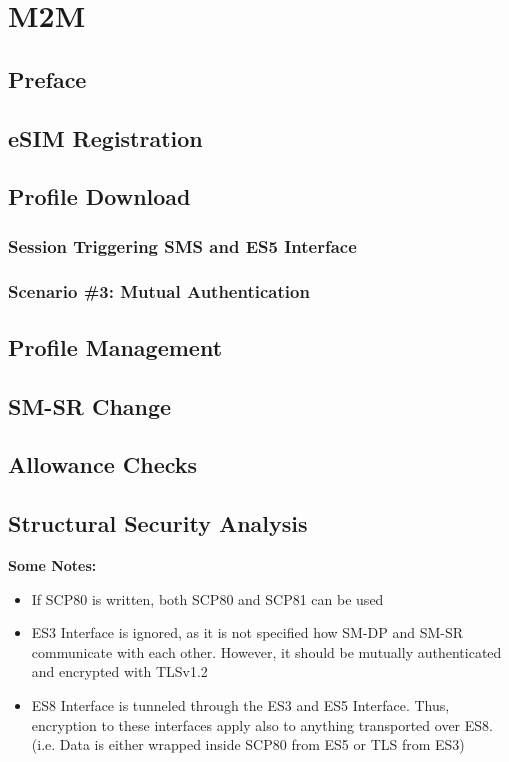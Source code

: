 \section{M2M}
\subsection{Preface}
\subsection{eSIM Registration}
\subsection{Profile Download}
\subsubsection{Session Triggering SMS and ES5 Interface}
\subsubsection{Scenario \#3: Mutual Authentication}
\subsection{Profile Management}
\subsection{SM-SR Change}
\subsection{Allowance Checks}

\subsection{Structural Security Analysis}
\textbf{Some Notes:}
\begin{itemize}
    \item If SCP80 is written, both SCP80 and SCP81 can be used
    \item ES3 Interface is ignored, as it is not specified how SM-DP and SM-SR communicate with each other. However, it should be mutually authenticated and encrypted with TLSv1.2
    \item ES8 Interface is tunneled through the ES3 and ES5 Interface. Thus, encryption to these interfaces apply also to anything transported over ES8. (i.e. Data is either wrapped inside SCP80 from ES5 or TLS from ES3)
\end{itemize}

